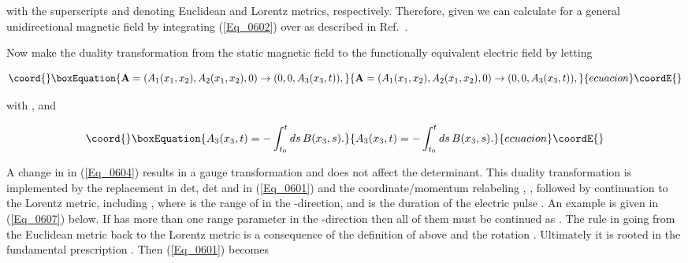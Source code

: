 \documentclass[a4paper,twocolumn,showpacs,preprintnumbers,amsmath,amssymb]{revtex4}
\begin{document}
\noindent
with the superscripts \coordHE{} and \coordHE{} denoting Euclidean and Lorentz metrics,
respectively. Therefore, given \coordHE{} we can
calculate \coordHE{} for a general unidirectional
magnetic field \coordHE{} by integrating (\ref{Eq_0602}) over
\coordHE{}  as described in Ref.~\cite{Fry92}.

Now make the duality transformation from the static magnetic field
\coordHE{} to the functionally equivalent electric field \coordHE{}
by letting

\begin{equation}\coord{}\boxEquation{
\label{Eq_0603}
\mathbf{A} = (A_1(x_1,x_2), A_2(x_1,x_2), 0) \to (0,0,A_3(x_3,t)),
}{
\mathbf{A} = (A_1(x_1,x_2), A_2(x_1,x_2), 0) \to (0,0,A_3(x_3,t)),
}{ecuacion}\coordE{}\end{equation}

\noindent
with \coordHE{},
\coordHE{} and

\begin{equation}\coord{}\boxEquation{
\label{Eq_0604}
A_3(x_3,t) = - \int^t_{t_0} ds \, B(x_3, s).
}{
A_3(x_3,t) = - \int^t_{t_0} ds \, B(x_3, s).
}{ecuacion}\coordE{}\end{equation}

\noindent
A change in \coordHE{} in (\ref{Eq_0604}) results in a gauge transformation
and does not affect the determinant. This duality transformation is
implemented by the replacement \coordHE{}
in det\coordHE{}, det\coordHE{} and \coordHE{} in
(\ref{Eq_0601}) and the coordinate/momentum relabeling
\coordHE{}, \coordHE{}, followed by continuation
to the Lorentz metric, including \coordHE{}, where \coordHE{} is
the range of \coordHE{} in the \coordHE{}-direction, and \myHighlight{$2\tau$}\coordHE{} is the duration
of the electric pulse \coordHE{}. An example is given in
(\ref{Eq_0607}) below. If \coordHE{} has more than one range parameter in the
\coordHE{}-direction then all of them must be continued as \coordHE{}. The rule
\coordHE{} in going from the Euclidean metric back to the
Lorentz metric is a consequence of the definition of \coordHE{} above and the
rotation \coordHE{}. Ultimately it is rooted
in the fundamental prescription \coordHE{}. Then
(\ref{Eq_0601}) becomes
\end{document}
